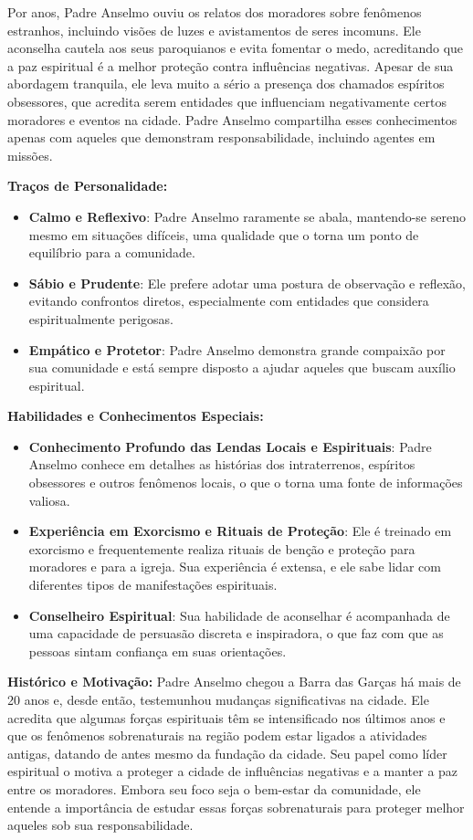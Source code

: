 Por anos, Padre Anselmo ouviu os relatos dos moradores sobre fenômenos estranhos, incluindo visões de luzes e avistamentos de seres incomuns. Ele aconselha cautela aos seus paroquianos e evita fomentar o medo, acreditando que a paz espiritual é a melhor proteção contra influências negativas. Apesar de sua abordagem tranquila, ele leva muito a sério a presença dos chamados espíritos obsessores, que acredita serem entidades que influenciam negativamente certos moradores e eventos na cidade. Padre Anselmo compartilha esses conhecimentos apenas com aqueles que demonstram responsabilidade, incluindo agentes em missões.

\textbf{Traços de Personalidade:}
\begin{itemize}
    \item \textbf{Calmo e Reflexivo}: Padre Anselmo raramente se abala, mantendo-se sereno mesmo em situações difíceis, uma qualidade que o torna um ponto de equilíbrio para a comunidade.
    \item \textbf{Sábio e Prudente}: Ele prefere adotar uma postura de observação e reflexão, evitando confrontos diretos, especialmente com entidades que considera espiritualmente perigosas.
    \item \textbf{Empático e Protetor}: Padre Anselmo demonstra grande compaixão por sua comunidade e está sempre disposto a ajudar aqueles que buscam auxílio espiritual.
\end{itemize}

\textbf{Habilidades e Conhecimentos Especiais:}
\begin{itemize}
    \item \textbf{Conhecimento Profundo das Lendas Locais e Espirituais}: Padre Anselmo conhece em detalhes as histórias dos intraterrenos, espíritos obsessores e outros fenômenos locais, o que o torna uma fonte de informações valiosa.
    \item \textbf{Experiência em Exorcismo e Rituais de Proteção}: Ele é treinado em exorcismo e frequentemente realiza rituais de benção e proteção para moradores e para a igreja. Sua experiência é extensa, e ele sabe lidar com diferentes tipos de manifestações espirituais.
    \item \textbf{Conselheiro Espiritual}: Sua habilidade de aconselhar é acompanhada de uma capacidade de persuasão discreta e inspiradora, o que faz com que as pessoas sintam confiança em suas orientações.
\end{itemize}

\textbf{Histórico e Motivação:}  
Padre Anselmo chegou a Barra das Garças há mais de 20 anos e, desde então, testemunhou mudanças significativas na cidade. Ele acredita que algumas forças espirituais têm se intensificado nos últimos anos e que os fenômenos sobrenaturais na região podem estar ligados a atividades antigas, datando de antes mesmo da fundação da cidade. Seu papel como líder espiritual o motiva a proteger a cidade de influências negativas e a manter a paz entre os moradores. Embora seu foco seja o bem-estar da comunidade, ele entende a importância de estudar essas forças sobrenaturais para proteger melhor aqueles sob sua responsabilidade.

